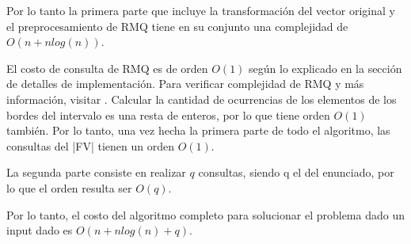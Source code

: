 Por lo tanto la primera parte que incluye la transformación del vector original y el preprocesamiento de RMQ
tiene en su conjunto una complejidad de $O(n + nlog(n))$.

El costo de consulta de RMQ es de orden $O(1)$ según lo explicado en la sección de detalles de implementación.
Para verificar complejidad de RMQ y más información, visitar \cite{topcoder}. Calcular la cantidad de ocurrencias
de los elementos de los bordes del intervalo es una resta de enteros, por lo que tiene orden $O(1)$ también. Por
lo tanto, una vez hecha la primera parte de todo el algoritmo, las consultas del |FV| tienen un orden $O(1)$.

La segunda parte consiste en realizar $q$ consultas, siendo q el del enunciado, por lo que el orden resulta ser
$O(q)$.

Por lo tanto, el costo del algoritmo completo para solucionar el problema dado un input dado es $O(n + nlog(n) + q)$.



